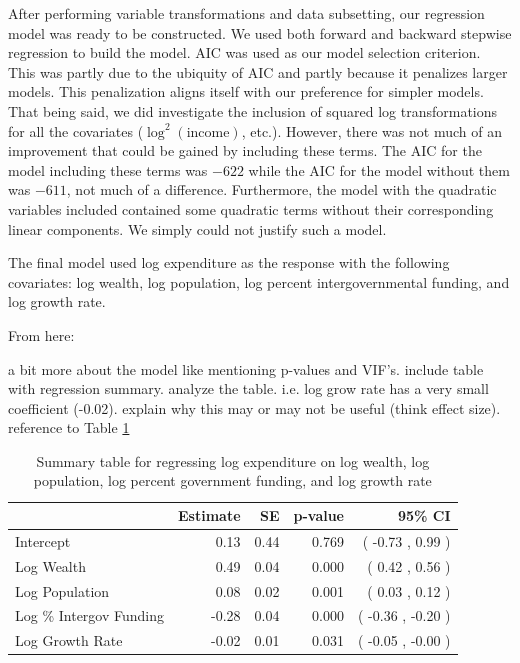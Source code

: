 \documentclass{article}\usepackage[]{graphicx}\usepackage[]{color}
\begin{document}
After performing variable transformations and data subsetting, our regression model was ready to be constructed. We used both forward and backward stepwise regression to build the model. AIC was used as our model selection criterion. This was partly due to the ubiquity of AIC and partly because it penalizes larger models. This penalization aligns itself with our preference for simpler models. That being said, we did investigate the inclusion of squared log transformations for all the covariates ($\log^2(\text{income})$, etc.). However, there was not much of an improvement that could be gained by including these terms. The AIC for the model including these terms was $-622$ while the AIC for the model without them was $-611$, not much of a difference. Furthermore, the model with the quadratic variables included contained some quadratic terms without their corresponding linear components. We simply could not justify such a model.

The final model used log expenditure as the response with the following covariates: log wealth, log population, log percent intergovernmental funding, and log growth rate.

From here: 

a bit more about the model like mentioning p-values and VIF's. include table with regression summary. analyze the table. i.e. log grow rate has a very small coefficient (-0.02). explain why this may or may not be useful (think effect size). reference to Table \ref{tbl:regress}


\begin{table}[ht]
\centering
\begin{tabular}{|l|rrrr|}
  \hline
 & Estimate & SE & p-value & 95\% CI \\ 
  \hline
Intercept & 0.13 & 0.44 & 0.769 & ( -0.73 , 0.99 ) \\ 
  Log Wealth & 0.49 & 0.04 & 0.000 & ( 0.42 , 0.56 ) \\ 
  Log Population & 0.08 & 0.02 & 0.001 & ( 0.03 , 0.12 ) \\ 
  Log \% Intergov Funding & -0.28 & 0.04 & 0.000 & ( -0.36 , -0.20 ) \\ 
  Log Growth Rate & -0.02 & 0.01 & 0.031 & ( -0.05 , -0.00 ) \\ 
   \hline
\end{tabular}
\caption{Summary table for regressing log expenditure on 
         log wealth, log population, log percent government funding,
         and log growth rate} 
\label{tbl:regress}
\end{table}
\end{document}
